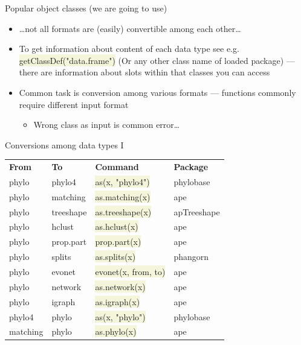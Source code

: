 \documentclass[compress, xelatex, 11pt, xcolor=svgnames, aspectratio=169, url={hyphens, lowtilde}]{beamer}
\renewcommand{\texttt}[1]{\colorbox{Beige}{{\ttfamily #1}}}
\begin{document}
\begin{frame}[allowframebreaks]{Popular object classes (we are going to use)}
\begin{itemize}
		\item \ldots not all formats are (easily) convertible among each other\ldots
		\item To get information about content of each data type see e.g. \texttt{getClassDef("data.frame")} (Or any other class name of loaded package) --- there are information about slots within that classes you can access
		\item Common task is conversion among various formats --- functions commonly require different input format
		\begin{itemize}
			\item Wrong class as input is common error\ldots
		\end{itemize}
	\end{itemize}
\end{frame}

\begin{frame}{Conversions among data types I}
	\begin{tabular}{llll}
		\textbf{From} & \textbf{To} & \textbf{Command} & \textbf{Package}\\
		phylo & phylo4 & \texttt{as(x, "phylo4")} & phylobase\\
		phylo & matching & \texttt{as.matching(x)} & ape\\
		phylo & treeshape & \texttt{as.treeshape(x)} & apTreeshape\\
		phylo & hclust & \texttt{as.hclust(x)} & ape\\
		phylo & prop.part & \texttt{prop.part(x)} & ape\\
		phylo & splits & \texttt{as.splits(x)} & phangorn\\
		phylo & evonet & \texttt{evonet(x, from, to)} & ape\\
		phylo & network & \texttt{as.network(x)} & ape\\
		phylo & igraph & \texttt{as.igraph(x)} & ape\\
		phylo4 & phylo & \texttt{as(x, "phylo")} & phylobase\\
		matching & phylo & \texttt{as.phylo(x)} & ape
	\end{tabular}
\end{frame}
\end{document}
